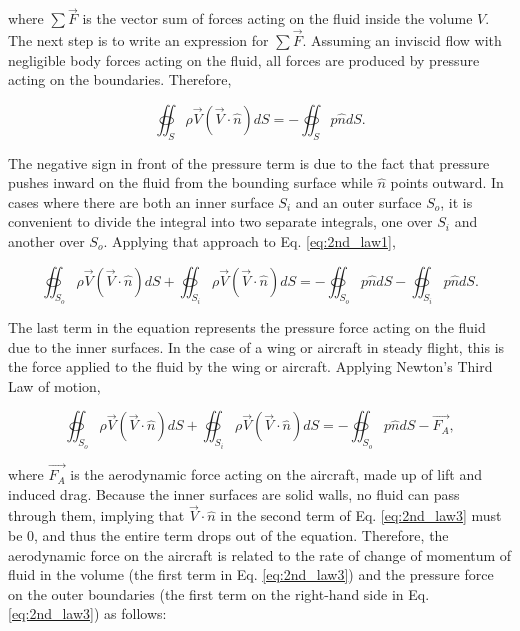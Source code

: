 \documentclass[11pt]{article}
\begin{document}
\noindent where $\sum\vec{F}$ is the vector sum of forces acting on the fluid
inside the volume $V$. The next step is to write an expression for
$\sum{\vec{F}}$.
Assuming an inviscid flow with negligible body forces acting on the fluid, all
forces are produced by pressure acting on the boundaries. Therefore,

\begin{equation}
\oiint_S\rho\vec{V}(\vec{V}\cdot\hat{n})dS = -\oiint_Sp\hat{n}dS.
\label{eq:2nd_law1}
\end{equation}

\noindent The negative sign in front of the pressure term is due to the fact
that pressure pushes inward on the fluid from the bounding surface while
$\hat{n}$ points outward. In cases where there are both an inner surface $S_i$
and an outer surface $S_o$, it is convenient to divide the integral into two
separate integrals, one over $S_i$ and another over $S_o$. Applying that
approach to Eq. \ref{eq:2nd_law1},

\begin{equation}
\oiint_{S_o}\rho\vec{V}(\vec{V}\cdot\hat{n})dS +
\oiint_{S_i}\rho\vec{V}(\vec{V}\cdot\hat{n})dS =
-\oiint_{S_o}p\hat{n}dS - \oiint_{S_i}p\hat{n}dS.
\label{eq:2nd_law2}
\end{equation}

The last term in the equation represents the pressure force acting on the fluid
due to the inner surfaces. In the case of a wing or aircraft in steady flight,
this is the force applied to the fluid by the wing or aircraft. Applying
Newton's Third Law of motion,

\begin{equation}
\oiint_{S_o}\rho\vec{V}(\vec{V}\cdot\hat{n})dS +
\oiint_{S_i}\rho\vec{V}(\vec{V}\cdot\hat{n})dS =
-\oiint_{S_o}p\hat{n}dS - \vec{F_A},
\label{eq:2nd_law3}
\end{equation}

\noindent where $\vec{F_A}$ is the aerodynamic force acting on the aircraft,
made up of lift and induced drag.
Because the inner surfaces are solid walls, no fluid can pass through them,
implying that $\vec{V}\cdot\hat{n}$ in the second term of Eq. \ref{eq:2nd_law3}
must be 0, and thus the entire term drops out of the equation. Therefore, the
aerodynamic force on the aircraft is related to
the rate of change of momentum of fluid in the volume (the first term in
Eq. \ref{eq:2nd_law3}) and the pressure force on the outer boundaries (the
first term on the right-hand side in Eq. \ref{eq:2nd_law3}) as follows:
\end{document}
